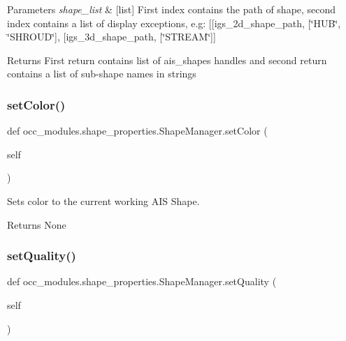 \begin{DoxyParams}{Parameters}
{\em shape\+\_\+list} & \mbox{[}list\mbox{]} First index contains the path of shape, second index contains a list of display exceptions, e.\+g\+: \mbox{[}\mbox{[}igs\+\_\+2d\+\_\+shape\+\_\+path, \mbox{[}\char`\"{}\+H\+U\+B\char`\"{}, \char`\"{}\+S\+H\+R\+O\+U\+D\char`\"{}\mbox{]}, \mbox{[}igs\+\_\+3d\+\_\+shape\+\_\+path, \mbox{[}\char`\"{}\+S\+T\+R\+E\+A\+M\char`\"{}\mbox{]}\mbox{]} \\
\hline
\end{DoxyParams}
\begin{DoxyReturn}{Returns}
First return contains list of ais\+\_\+shapes handles and second return contains a list of sub-\/shape names in strings 
\end{DoxyReturn}
\hypertarget{a00101_ac659823f3085963daf751a6a94b366a7}{}\label{a00101_ac659823f3085963daf751a6a94b366a7} 
\subsubsection{\texorpdfstring{set\+Color()}{setColor()}}
{\footnotesize\ttfamily def occ\+\_\+modules.\+shape\+\_\+properties.\+Shape\+Manager.\+set\+Color (\begin{DoxyParamCaption}\item[{}]{self }\end{DoxyParamCaption})}



Sets color to the current working A\+IS Shape. 

\begin{DoxyReturn}{Returns}
None 
\end{DoxyReturn}
\hypertarget{a00101_abe8c1dbcfe98b9f86a0560dd1e8b853a}{}\label{a00101_abe8c1dbcfe98b9f86a0560dd1e8b853a} 
\subsubsection{\texorpdfstring{set\+Quality()}{setQuality()}}
{\footnotesize\ttfamily def occ\+\_\+modules.\+shape\+\_\+properties.\+Shape\+Manager.\+set\+Quality (\begin{DoxyParamCaption}\item[{}]{self }\end{DoxyParamCaption})}



